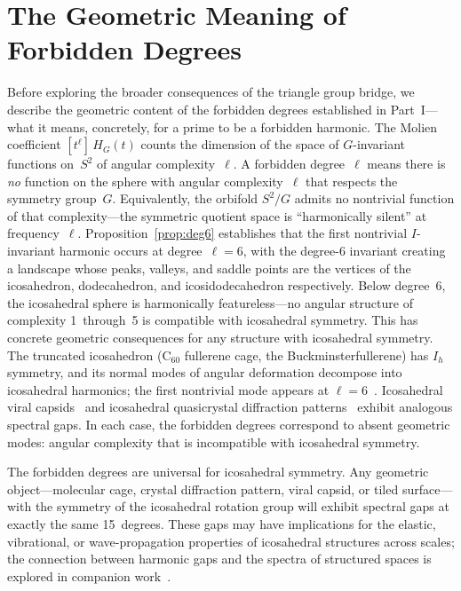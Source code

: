 \documentclass[11pt,letterpaper]{article}
\theoremstyle{definition}
\begin{document}
\section{The Geometric Meaning of Forbidden Degrees}\label{sec:geometric}
Before exploring the broader consequences of the triangle group bridge, we describe the geometric content of the forbidden degrees established in Part~I---what it means, concretely, for a prime to be a forbidden harmonic.
The Molien coefficient $[t^\ell]\,H_G(t)$ counts the dimension of the space of $G$-invariant functions on~$S^2$ of angular complexity~$\ell$.  A forbidden degree~$\ell$ means there is \emph{no} function on the sphere with angular complexity~$\ell$ that respects the symmetry group~$G$.  Equivalently, the orbifold $S^2/G$ admits no nontrivial function of that complexity---the symmetric quotient space is ``harmonically silent'' at frequency~$\ell$.
Proposition~\ref{prop:deg6} establishes that the first nontrivial $I$-invariant harmonic occurs at degree~$\ell=6$, with the degree-6 invariant creating a landscape whose peaks, valleys, and saddle points are the vertices of the icosahedron, dodecahedron, and icosidodecahedron respectively.  Below degree~6, the icosahedral sphere is harmonically featureless---no angular structure of complexity 1~through~5 is compatible with icosahedral symmetry.
This has concrete geometric consequences for any structure with icosahedral symmetry.  The truncated icosahedron ($\mathrm{C}_{60}$ fullerene cage, the Buckminsterfullerene) has $I_h$ symmetry, and its normal modes of angular deformation decompose into icosahedral harmonics; the first nontrivial mode appears at $\ell=6$~\cite{Dresselhaus1996}.  Icosahedral viral capsids~\cite{Caspar1962} and icosahedral quasicrystal diffraction patterns~\cite{Shechtman1984,Senechal1995} exhibit analogous spectral gaps.  In each case, the forbidden degrees correspond to absent geometric modes: angular complexity that is incompatible with icosahedral symmetry.
\begin{remarkbox}
The forbidden degrees are universal for icosahedral symmetry.  Any geometric object---molecular cage, crystal diffraction pattern, viral capsid, or tiled surface---with the symmetry of the icosahedral rotation group will exhibit spectral gaps at exactly the same 15~degrees.  These gaps may have implications for the elastic, vibrational, or wave-propagation properties of icosahedral structures across scales; the connection between harmonic gaps and the spectra of structured spaces is explored in companion work~\cite{Meucci2026loop,Meucci2025pauli}.
\end{remarkbox}
\end{document}
